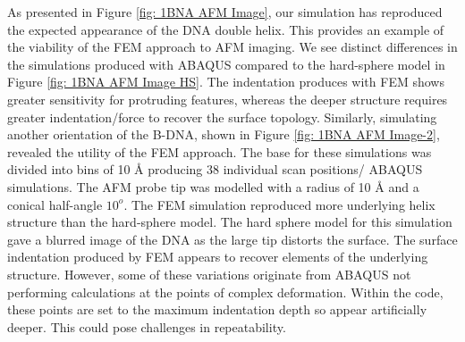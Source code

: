 As presented in Figure \ref{fig: 1BNA AFM Image}, our simulation has reproduced the expected appearance of the DNA double helix. This provides an example of the viability of the FEM approach to AFM imaging. We see distinct differences in the simulations produced with ABAQUS compared to the hard-sphere model in Figure \ref{fig: 1BNA AFM Image HS}. The indentation produces with FEM shows greater sensitivity for protruding features, whereas the deeper structure requires greater indentation/force to recover the surface topology. Similarly, simulating another orientation of the B-DNA, shown in Figure \ref{fig: 1BNA AFM Image-2}, revealed the utility of the FEM approach. The base for these simulations was divided into bins of 10 $\text{\AA}$ producing 38 individual scan positions/ ABAQUS simulations. The AFM probe tip was modelled with a radius of 10 $\text{\AA}$ and a conical half-angle $10^{o}$. The FEM simulation reproduced more underlying helix structure than the hard-sphere model. The hard sphere model for this simulation gave a blurred image of the DNA as the large tip distorts the surface. The surface indentation produced by FEM appears to recover elements of the underlying structure. However, some of these variations originate from ABAQUS not performing calculations at the points of complex deformation. Within the code, these points are set to the maximum indentation depth so appear artificially deeper. This could pose challenges in repeatability. 

